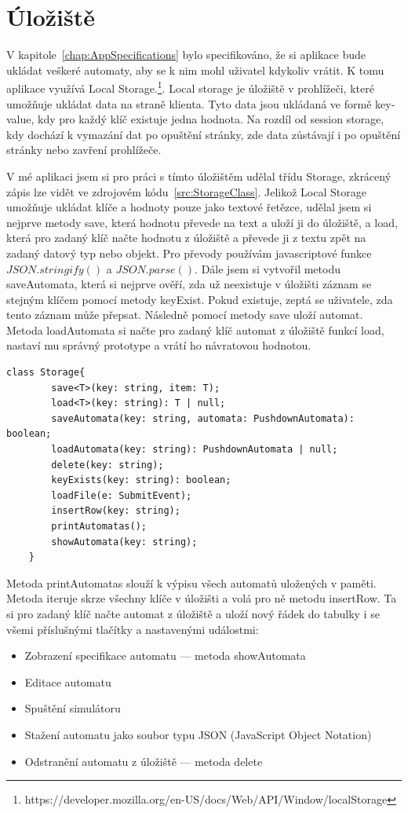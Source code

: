 \section{Úložiště}
V kapitole~\ref{chap:AppSpecifications} bylo specifikováno, že si aplikace bude ukládat veškeré automaty, aby se k nim mohl uživatel kdykoliv vrátit. K tomu aplikace využívá Local Storage.\footnote{https://developer.mozilla.org/en-US/docs/Web/API/Window/localStorage}. Local storage je úložiště v prohlížeči, které umožňuje ukládat data na straně klienta. Tyto data jsou ukládaná ve formě key-value, kdy pro každý klíč existuje jedna hodnota. Na rozdíl od session storage, kdy dochází k vymazání dat po opuštění stránky, zde data zůstávají i po opuštění stránky nebo zavření prohlížeče.\cite{Obaseki2020}

V mé aplikaci jsem si pro práci s tímto úložištěm udělal třídu Storage, zkrácený zápis lze vidět ve zdrojovém kódu~\ref{src:StorageClass}. Jelikož Local Storage umožňuje ukládat klíče a hodnoty pouze jako textové řetězce, udělal jsem si nejprve metody save, která hodnotu převede na text a uloží ji do úložiště, a load, která pro zadaný klíč načte hodnotu z úložiště a převede ji z textu zpět na zadaný datový typ nebo objekt. Pro převody používám javascriptové funkce $JSON.stringify()$ a $JSON.parse()$. Dále jsem si vytvořil metodu saveAutomata, která si nejprve ověří, zda už neexistuje v úložišti záznam se stejným klíčem pomocí metody keyExist. Pokud existuje, zeptá se uživatele, zda tento záznam může přepsat. Následně pomocí metody save uloží automat. Metoda loadAutomata si načte pro zadaný klíč automat z úložiště funkcí load, nastaví mu správný prototype a vrátí ho návratovou hodnotou. 

\begin{lstlisting}[label=src:StorageClass, caption={Třída Storage}]
    class Storage{
        save<T>(key: string, item: T);
        load<T>(key: string): T | null;
        saveAutomata(key: string, automata: PushdownAutomata): boolean;
        loadAutomata(key: string): PushdownAutomata | null;
        delete(key: string);
        keyExists(key: string): boolean;
        loadFile(e: SubmitEvent);
        insertRow(key: string);
        printAutomatas();
        showAutomata(key: string);
    }
\end{lstlisting}

Metoda printAutomatas slouží k výpisu všech automatů uložených v paměti. Metoda iteruje skrze všechny klíče v úložišti a volá pro ně metodu insertRow. Ta si pro zadaný klíč načte automat z úložiště a uloží nový řádek do tabulky i se všemi příslušnými tlačítky a nastavenými událostmi:
\begin{itemize}
    \item Zobrazení specifikace automatu --- metoda showAutomata
    \item Editace automatu
    \item Spuštění simulátoru
    \item Stažení automatu jako soubor typu JSON (JavaScript Object Notation)
    \item Odstranění automatu z úložiště --- metoda delete
\end{itemize}


